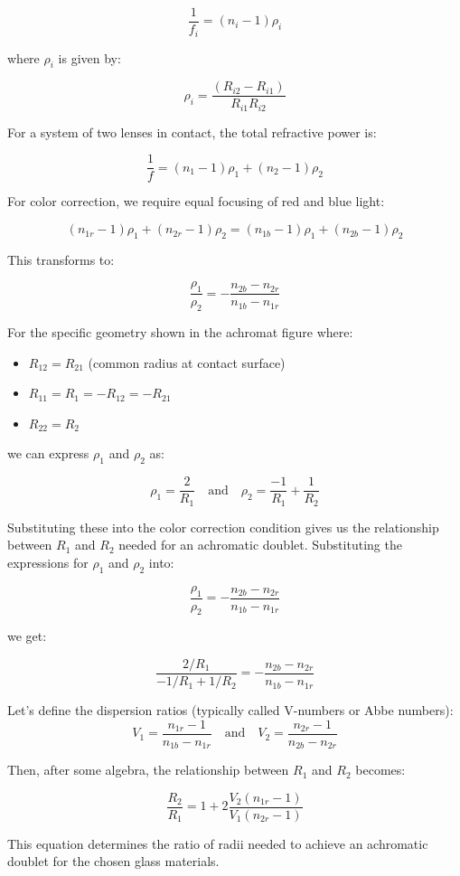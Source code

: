 \documentclass[
  a4paper,
]{book}
\providecommand{\tightlist}{%
  \setlength{\itemsep}{0pt}\setlength{\parskip}{0pt}}
\begin{document}
\[
\frac{1}{f_i}=(n_i-1)\rho_i
\]

where \(\rho_i\) is given by:

\[
\rho_i=\frac{(R_{i2}-R_{i1})}{R_{i1}R_{i2}}
\]

For a system of two lenses in contact, the total refractive power is:

\[
\frac{1}{f}=(n_1-1)\rho_1+(n_2-1)\rho_2
\]

For color correction, we require equal focusing of red and blue light:

\[
(n_{1r}-1)\rho_1+(n_{2r}-1)\rho_2=(n_{1b}-1)\rho_1+(n_{2b}-1)\rho_2
\]

This transforms to:

\[
\frac{\rho_1}{\rho_2}=-\frac{n_{2b}-n_{2r}}{n_{1b}-n_{1r}}
\]

For the specific geometry shown in the achromat figure where:

\begin{itemize}
\tightlist
\item
  \(R_{12}=R_{21}\) (common radius at contact surface)
\item
  \(R_{11}=R_1=-R_{12}=-R_{21}\)
\item
  \(R_{22}=R_2\)
\end{itemize}

we can express \(\rho_1\) and \(\rho_2\) as:

\[
\rho_1=\frac{2}{R_1} \quad \text{and} \quad \rho_2=\frac{-1}{R_1}+\frac{1}{R_2}
\]

Substituting these into the color correction condition gives us the
relationship between \(R_1\) and \(R_2\) needed for an achromatic
doublet. Substituting the expressions for \(\rho_1\) and \(\rho_2\)
into:

\[
\frac{\rho_1}{\rho_2}=-\frac{n_{2b}-n_{2r}}{n_{1b}-n_{1r}}
\]

we get:

\[
\frac{2/R_1}{-1/R_1+1/R_2}=-\frac{n_{2b}-n_{2r}}{n_{1b}-n_{1r}}
\]

Let's define the dispersion ratios (typically called V-numbers or Abbe
numbers): \[
V_1=\frac{n_{1r}-1}{n_{1b}-n_{1r}} \quad \text{and} \quad V_2=\frac{n_{2r}-1}{n_{2b}-n_{2r}}
\]

Then, after some algebra, the relationship between \(R_1\) and \(R_2\)
becomes:

\[
\frac{R_2}{R_1}=1+2\frac{V_2(n_{1r}-1)}{V_1(n_{2r}-1)}
\]

This equation determines the ratio of radii needed to achieve an
achromatic doublet for the chosen glass materials.
\end{document}
